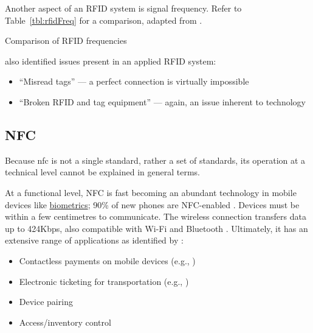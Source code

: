 Another aspect of an RFID system is signal frequency.
Refer to Table~\ref{tbl:rfidFreq} for a comparison, adapted
from \cite{whatIsRfid}.

\begin{table}[h]
  \centering
  \small
  
  \caption{Comparison of RFID frequencies}
  \label{tbl:rfidFreq}
\end{table}

\cite{barcodeRfidComparison} also identified issues present
in an applied RFID system:

\begin{itemize}

  \item \enquote{Misread tags} --- a perfect
        connection is virtually impossible

  \item \enquote{Broken RFID and tag equipment}
        --- again, an issue inherent to technology

\end{itemize}

\subsection{NFC} \label{ss:nfc}

Because \gls{nfc} is not a single standard, rather a set of
standards, its operation at a technical level cannot be
explained in general terms.

At a functional level, NFC is fast becoming an abundant
technology in mobile devices like
\hyperref[ss:biometrics]{biometrics}; 90\% of new phones
are NFC-enabled \parencite{nfcHandsetStats}.
Devices must be within a few centimetres to communicate.
The wireless connection transfers data up to 424Kbps, also
compatible with Wi-Fi and Bluetooth \parencite{nfc}.
Ultimately, it has an extensive range of applications as
identified by \cite{nfc}: 

\begin{itemize} 

  \item Contactless payments on mobile devices (e.g.,
        \cite{androidPayWithPhone, applePay}) 

  \item Electronic ticketing for transportation (e.g.,
        \cite{digitalTickets}) 

  \item Device pairing 

  \item Access/inventory control 

\end{itemize} 

